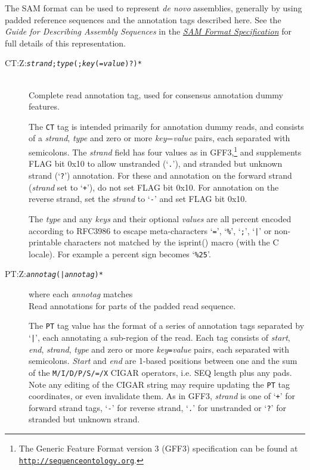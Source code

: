 \documentclass[10pt]{article}
\newcommand{\tagregex}[1]{{\tt #1}}
\newcommand{\metavar}[1]{{\rm\emph{#1}}}
\begin{document}
The SAM format can be used to represent \emph{de novo} assemblies, generally by using padded reference sequences and the annotation tags described here.
See the \emph{Guide for Describing Assembly Sequences} in the \href{http://samtools.github.io/hts-specs/SAMv1.pdf}{\emph{SAM Format Specification}} for full details of this representation.

\begin{description}
\item[CT:Z:\tagregex{\metavar{strand};\metavar{type}(;\metavar{key}(=\metavar{value})?)*}]
\hfill\\
Complete read annotation tag, used for consensus annotation dummy features.

The {\tt CT} tag is intended primarily for annotation
dummy reads, and consists of a \emph{strand}, \emph{type} and zero or
more \emph{key}=\emph{value} pairs, each separated with semicolons.
The \emph{strand} field has four values as in GFF3,\footnote{The
Generic Feature Format version 3 (GFF3) specification can be found at
\href{http://www.sequenceontology.org/}{\tt http://sequenceontology.org}.}
and supplements FLAG
bit 0x10 to allow unstranded (`{\tt .}'), and stranded but unknown strand
(`{\tt ?}') annotation. For these and annotation on the forward strand
(\emph{strand} set to `{\tt +}'), do not set FLAG bit 0x10. For
annotation on the reverse strand, set the \emph{strand} to `{\tt -}'
and set FLAG bit 0x10.

The \emph{type} and any \emph{keys} and their
optional \emph{values} are all percent encoded according to
RFC3986 to escape meta-characters `{\tt =}', `{\tt \%}', `{\tt ;}',
`{\tt |}' or non-printable characters not matched by the isprint()
macro (with the C locale). For example a percent sign becomes
`{\tt \%25}'.

\item[PT:Z:\tagregex{\metavar{annotag}(|\metavar{annotag})*}]\enskip where each \metavar{annotag} matches\quad\tagregex{\metavar{start};\metavar{end};\metavar{strand};\metavar{type}(;\metavar{key}(=\metavar{value})?)*}
\hfill\\
Read annotations for parts of the padded read sequence.

The {\tt PT} tag value has the format of a series of annotation
tags separated by `{\tt |}', each annotating a sub-region of the read.
Each tag consists of \emph{start}, \emph{end}, \emph{strand},
\emph{type} and zero or more \emph{key}{\tt =}\emph{value} pairs, each
separated with semicolons. \emph{Start} and \emph{end} are 1-based
positions between one and the sum of the {\tt M/I/D/P/S/=/X}
{\sf CIGAR} operators, i.e. {\sf SEQ} length plus any pads.  Note
any editing of the CIGAR string may require updating the {\tt PT}
tag coordinates, or even invalidate them.
As in GFF3, \emph{strand} is one of `{\tt +}' for forward strand tags,
`{\tt -}' for reverse strand, `{\tt .}' for unstranded or `{\tt ?}'
for stranded but unknown strand.


\end{description}
\end{document}
